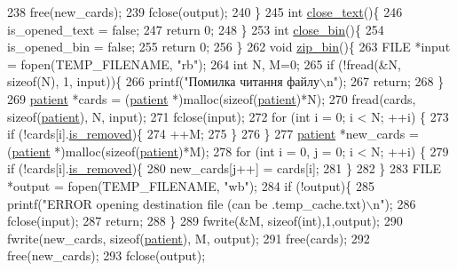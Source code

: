 \begin{DoxyCodeInclude}
{{{{{238     free(new\_cards);
239     fclose(output);
240 \}
245 \textcolor{keywordtype}{int} \hyperlink{main_8c_add4eb0f3cf9c3c78e967cc9f6ff4fd39}{close\_text}()\{
246     is\_opened\_text = \textcolor{keyword}{false};
247     \textcolor{keywordflow}{return} 0;
248 \}
253 \textcolor{keywordtype}{int} \hyperlink{main_8c_ab1a09599960a374bdce391f8c424b83f}{close\_bin}()\{
254     is\_opened\_bin = \textcolor{keyword}{false};
255     \textcolor{keywordflow}{return} 0;
256 \}
262 \textcolor{keywordtype}{void} \hyperlink{main_8c_a56f7f6edbc88169ca7785ff69d03396e}{zip\_bin}()\{
263     FILE *input = fopen(TEMP\_FILENAME, \textcolor{stringliteral}{"rb"});
264     \textcolor{keywordtype}{int} N, M=0;
265     \textcolor{keywordflow}{if} (!fread(&N, \textcolor{keyword}{sizeof}(N), 1, input))\{
266         printf(\textcolor{stringliteral}{"Помилка читання файлу\(\backslash\)n"});
267         \textcolor{keywordflow}{return};
268     \}
269     \hyperlink{structpatient__struct}{patient} *cards = (\hyperlink{structpatient__struct}{patient} *)malloc(\textcolor{keyword}{sizeof}(\hyperlink{structpatient__struct}{patient})*N);
270     fread(cards, \textcolor{keyword}{sizeof}(\hyperlink{structpatient__struct}{patient}), N, input);
271     fclose(input);
272     \textcolor{keywordflow}{for} (\textcolor{keywordtype}{int} i = 0; i < N; ++i) \{
273         \textcolor{keywordflow}{if} (!cards[i].\hyperlink{structpatient__struct_ad2475b69abfa9243c2700d63b63aa79b}{is\_removed})\{
274             ++M;
275         \}
276     \}
277     \hyperlink{structpatient__struct}{patient} *new\_cards = (\hyperlink{structpatient__struct}{patient} *)malloc(\textcolor{keyword}{sizeof}(\hyperlink{structpatient__struct}{patient})*M);
278     \textcolor{keywordflow}{for} (\textcolor{keywordtype}{int} i = 0, j = 0; i < N; ++i) \{
279         \textcolor{keywordflow}{if} (!cards[i].\hyperlink{structpatient__struct_ad2475b69abfa9243c2700d63b63aa79b}{is\_removed})\{
280             new\_cards[j++] = cards[i];
281         \}
282     \}
283     FILE *output = fopen(TEMP\_FILENAME, \textcolor{stringliteral}{"wb"});
284     \textcolor{keywordflow}{if} (!output)\{
285         printf(\textcolor{stringliteral}{"ERROR opening destination file (can be .temp\_cache.txt)\(\backslash\)n"});
286         fclose(input);
287         \textcolor{keywordflow}{return};
288     \}
289     fwrite(&M, \textcolor{keyword}{sizeof}(\textcolor{keywordtype}{int}),1,output);
290     fwrite(new\_cards, \textcolor{keyword}{sizeof}(\hyperlink{structpatient__struct}{patient}), M, output);
291     free(cards);
292     free(new\_cards);
293     fclose(output);
}}}}}
\end{DoxyCodeInclude}
